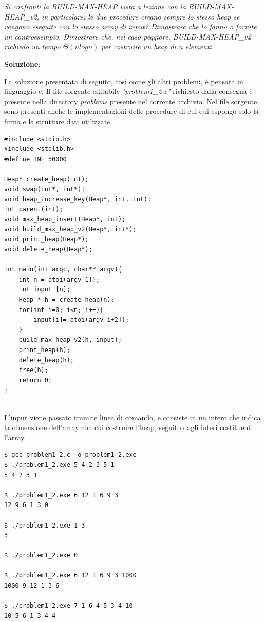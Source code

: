 \documentclass{article}
\begin{document}
\noindent \textit{Si confronti la BUILD-MAX-HEAP vista a lezione con la BUILD-MAX-HEAP\_v2, in particolare: le due procedure creano sempre lo stesso heap se vengono eseguite con lo 
stesso array di input? Dimostrare che lo fanno o fornite un controesempio. Dimostrare che, nel caso peggiore, BUILD-MAX-HEAP\_v2 richiedo un tempo $\Theta(nlogn)$ per costruire un heap di n elementi. }

\vspace{2\baselineskip}
\noindent
\textbf{Soluzione}: 

\noindent
La soluzione presentata di seguito, così come gli altri problemi, è pensata in linguaggio c. Il file sorgente editabile \textit{"problem1\_2.c"} richiesto dalla consegna è presente nella directory \textit{problems} presente nel corrente archivio. Nel file sorgente sono presenti anche le implementazioni delle procedure di cui qui espongo solo la firma e le strutture dati utilizzate.

\begin{lstlisting}
#include <stdio.h>
#include <stdlib.h>
#define INF 50000

Heap* create_heap(int);
void swap(int*, int*);
void heap_increase_key(Heap*, int, int);
int parent(int);
void max_heap_insert(Heap*, int);
void build_max_heap_v2(Heap*, int*);
void print_heap(Heap*);
void delete_heap(Heap*);

int main(int argc, char** argv){
    int n = atoi(argv[1]);
    int input [n];
    Heap * h = create_heap(n);
    for(int i=0; i<n; i++){
        input[i]= atoi(argv[i+2]);
    }
    build_max_heap_v2(h, input);
    print_heap(h);
    delete_heap(h);
    free(h);
    return 0;
}


\end{lstlisting}
\noindent
L'input viene passato tramite linea di comando, e consiste in un intero che indica la dimensione dell'array con cui costruire l'heap, seguito dagli interi costituenti l'array. 



\begin{commandline}
\begin{verbatim}
$ gcc problem1_2.c -o problem1_2.exe
$ ./problem1_2.exe 5 4 2 3 5 1 
5 4 2 3 1

$ ./problem1_2.exe 6 12 1 6 9 3 
12 9 6 1 3 0 

$ ./problem1_2.exe 1 3 
3

$ ./problem1_2.exe 0

$ ./problem1_2.exe 6 12 1 6 9 3 1000
1000 9 12 1 3 6

$ ./problem1_2.exe 7 1 6 4 5 3 4 10
10 5 6 1 3 4 4

\end{verbatim}
\end{commandline}
\end{document}
